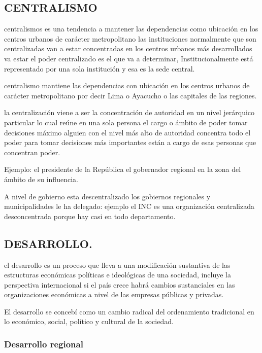 \documentclass[
  a4paper,
]{article}
\begin{document}
\hypertarget{centralismo}{%
\subsection{CENTRALISMO}\label{centralismo}}

centralismos es una tendencia a mantener las dependencias como ubicación
en los centros urbanos de carácter metropolitano las instituciones
normalmente que son centralizadas van a estar concentradas en los
centros urbanos más desarrollados va estar el poder centralizado es el
que va a determinar, Institucionalmente está representado por una sola
institución y esa es la sede central.

centralismo mantiene las dependencias con ubicación en los centros
urbanos de carácter metropolitano por decir Lima o Ayacucho o las
capitales de las regiones.

la centralización viene a ser la concentración de autoridad en un nivel
jerárquico particular lo cual reúne en una sola persona el cargo o
ámbito de poder tomar decisiones máximo alguien con el nivel más alto de
autoridad concentra todo el poder para tomar decisiones más importantes
están a cargo de esas personas que concentran poder.

Ejemplo: el presidente de la República el gobernador regional en la zona
del ámbito de su influencia.

A nivel de gobierno esta descentralizado los gobiernos regionales y
municipalidades le ha delegado: ejemplo el INC es una organización
centralizada desconcentrada porque hay casi en todo departamento.

\hypertarget{desarrollo.}{%
\subsection{DESARROLLO.}\label{desarrollo.}}

el desarrollo es un proceso que lleva a una modificación sustantiva de
las estructuras económicas políticas e ideológicas de una sociedad,
incluye la perspectiva internacional si el país crece habrá cambios
sustanciales en las organizaciones económicas a nivel de las empresas
públicas y privadas.

El desarrollo se concebí como un cambio radical del ordenamiento
tradicional en lo económico, social, político y cultural de la sociedad.

\hypertarget{desarrollo-regional}{%
\subsubsection{Desarrollo regional}\label{desarrollo-regional}}
\end{document}
